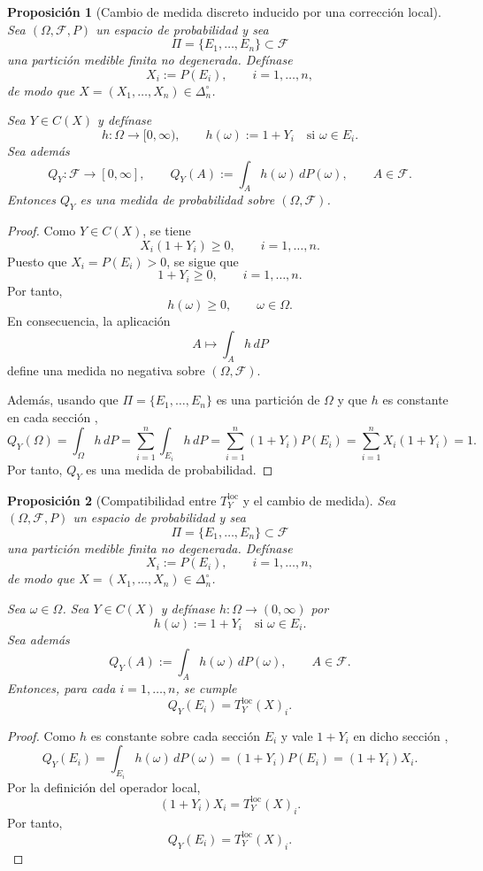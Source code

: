 \documentclass[12pt]{article}
\newtheorem{proposicion}{Proposición}[section]
\begin{document}
\begin{proposicion}[Cambio de medida discreto inducido por una corrección local]\label{prop:QYprobabilidad}
Sea $(\Omega,\mathcal F,P)$ un espacio de probabilidad y sea
\[
\Pi=\{E_1,\dots,E_n\}\subset\mathcal F
\]
una partición medible finita no degenerada. Defínase
\[
X_i:=P(E_i),\qquad i=1,\dots,n,
\]
de modo que $X=(X_1,\dots,X_n)\in\Delta_n^\circ$.

Sea $Y\in C(X)$ y defínase
\[
h:\Omega\to[0,\infty),
\qquad
h(\omega):=1+Y_i
\quad\text{si }\omega\in E_i.
\]
Sea además
\[
Q_Y:\mathcal F\to[0,\infty],
\qquad
Q_Y(A):=\int_A h(\omega)\,dP(\omega),
\qquad A\in\mathcal F.
\]
Entonces $Q_Y$ es una medida de probabilidad sobre $(\Omega,\mathcal F)$.
\end{proposicion}

\begin{proof}
Como $Y\in C(X)$, se tiene
\[
X_i(1+Y_i)\ge 0,\qquad i=1,\dots,n.
\]
Puesto que $X_i=P(E_i)>0$, se sigue que
\[
1+Y_i\ge 0,\qquad i=1,\dots,n.
\]
Por tanto,
\[
h(\omega)\ge 0,\qquad \omega\in\Omega.
\]
En consecuencia, la aplicación
\[
A\mapsto \int_A h\,dP
\]
define una medida no negativa sobre $(\Omega,\mathcal F)$.

Además, usando que $\Pi=\{E_1,\dots,E_n\}$ es una partición de $\Omega$ y que $h$ es constante en cada sección ,
\[
Q_Y(\Omega)
=
\int_\Omega h\,dP
=
\sum_{i=1}^n \int_{E_i} h\,dP
=
\sum_{i=1}^n (1+Y_i)P(E_i)
=
\sum_{i=1}^n X_i(1+Y_i)
=
1.
\]
Por tanto, $Q_Y$ es una medida de probabilidad.
\end{proof}

\begin{proposicion}[Compatibilidad entre $T_Y^{\mathrm{loc}}$ y el cambio de medida]\label{prop:compatibilidadCambioMedida}
Sea $(\Omega,\mathcal F,P)$ un espacio de probabilidad y sea
\[
\Pi=\{E_1,\dots,E_n\}\subset\mathcal F
\]
una partición medible finita no degenerada. Defínase
\[
X_i:=P(E_i),\qquad i=1,\dots,n,
\]
de modo que $X=(X_1,\dots,X_n)\in\Delta_n^\circ$.

Sea $\omega \in \Omega$. Sea $Y \in C(X)$ y defínase $h:\Omega \to (0,\infty)$ por
\[
h(\omega):=1+Y_i \quad \text{si } \omega \in E_i.
\]
Sea además
\[
Q_Y(A):=\int_A h(\omega)\,dP(\omega),
\qquad A\in\mathcal F.
\]
Entonces, para cada $i=1,\dots,n$, se cumple
\[
Q_Y(E_i)=T_Y^{\mathrm{loc}}(X)_i.
\]
\end{proposicion}

\begin{proof}
Como $h$ es constante sobre cada sección  $E_i$ y vale $1+Y_i$ en dicho sección ,
\[
Q_Y(E_i)
=
\int_{E_i} h(\omega)\,dP(\omega)
=
(1+Y_i)P(E_i)
=
(1+Y_i)X_i.
\]
Por la definición del operador local,
\[
(1+Y_i)X_i=T_Y^{\mathrm{loc}}(X)_i.
\]
Por tanto,
\[
Q_Y(E_i)=T_Y^{\mathrm{loc}}(X)_i.
\]
\end{proof}
\end{document}
